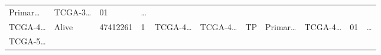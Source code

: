 \documentclass[
]{article}
\begin{document}
\begin{longtable}[]{@{}lllllllllll@{}}
\begin{minipage}[t]{0.07\columnwidth}
Primar\ldots{}\strut
\end{minipage} & \begin{minipage}[t]{0.09\columnwidth}\raggedright
TCGA-3\ldots{}\strut
\end{minipage} & \begin{minipage}[t]{0.10\columnwidth}\raggedright
01\strut
\end{minipage} & \begin{minipage}[t]{0.03\columnwidth}\raggedright
\ldots{}\strut
\end{minipage}\tabularnewline
\begin{minipage}[t]{0.07\columnwidth}\raggedright
TCGA-4\ldots{}\strut
\end{minipage} & \begin{minipage}[t]{0.04\columnwidth}\raggedright
Alive\strut
\end{minipage} & \begin{minipage}[t]{0.06\columnwidth}\raggedright
47412261\strut
\end{minipage} & \begin{minipage}[t]{0.07\columnwidth}\raggedright
1\strut
\end{minipage} & \begin{minipage}[t]{0.07\columnwidth}\raggedright
TCGA-4\ldots{}\strut
\end{minipage} & \begin{minipage}[t]{0.07\columnwidth}\raggedright
TCGA-4\ldots{}\strut
\end{minipage} & \begin{minipage}[t]{0.07\columnwidth}\raggedright
TP\strut
\end{minipage} & \begin{minipage}[t]{0.07\columnwidth}\raggedright
Primar\ldots{}\strut
\end{minipage} & \begin{minipage}[t]{0.09\columnwidth}\raggedright
TCGA-4\ldots{}\strut
\end{minipage} & \begin{minipage}[t]{0.10\columnwidth}\raggedright
01\strut
\end{minipage} & \begin{minipage}[t]{0.03\columnwidth}\raggedright
\ldots{}\strut
\end{minipage}\tabularnewline
\begin{minipage}[t]{0.07\columnwidth}\raggedright
TCGA-5\ldots{}\strut
\end{minipage} & \begin{minipage}[t]{0.04\columnwidth}\raggedright

\end{minipage}
\end{longtable}
\end{document}
